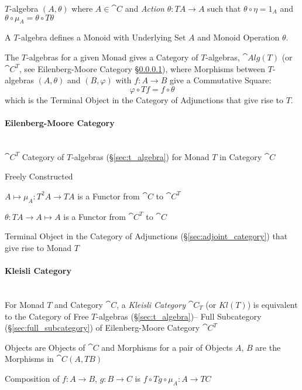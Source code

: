 $T$-algebra $(A, \theta)$ where $A \in \cat{C}$ and \emph{Action}
$\theta : T A \rightarrow A$ such that $\theta \circ \eta = 1_A$ and
$\theta \circ \mu_A = \theta \circ T \theta$

A $T$-algebra defines a Monoid with Underlying Set $A$ and Monoid
Operation $\theta$.

The $T$-algebras for a given Monad gives a Category of $T$-algebras,
$\cat{Alg}(T)$ (or $\cat{C}^T$, see Eilenberg-Moore Category
\S\ref{sec:eilenberg_moore}), where Morphisms between $T$-algebras
$(A, \theta)$ and $(B, \varphi)$ with $f : A \rightarrow B$ give a
Commutative Square:
\[
  \varphi \circ T f = f \circ \theta
\]
which is the Terminal Object in the Category of Adjunctions that give
rise to $T$.



\paragraph{Eilenberg-Moore Category}\label{sec:eilenberg_moore}
\hfill \\

$\cat{C}^T$ Category of $T$-algebras (\S\ref{sec:t_algebra}) for
Monad $T$ in Category $\cat{C}$

Freely Constructed

$A \mapsto \mu_A : T^2 A \rightarrow T A$ is a Functor from
$\cat{C}$ to $\cat{C}^T$

$\theta : T A \rightarrow A \mapsto A$ is a Functor from
$\cat{C}^T$ to $\cat{C}$

Terminal Object in the Category of Adjunctions
(\S\ref{sec:adjoint_category}) that give rise to Monad $T$



\paragraph{Kleisli Category}\label{sec:kleisli_category}
\hfill \\

For Monad $T$ and Category $\cat{C}$, a \emph{Kleisli Category}
$\cat{C}_T$ (or $Kl(T)$) is equivalent to the Category of Free
$T$-algebras (\S\ref{sec:t_algebra})-- Full Subcategory
(\S\ref{sec:full_subcategory}) of Eilenberg-Moore Category
$\cat{C}^T$

Objects are Objects of $\cat{C}$ and Morphisms for a pair of
Objects $A$, $B$ are the Morphisms in $\cat{C}(A, T B)$

Composition of $f : A \rightarrow B$, $g : B \rightarrow C$ is $f
\circ T g \circ \mu_A : A \rightarrow TC$

